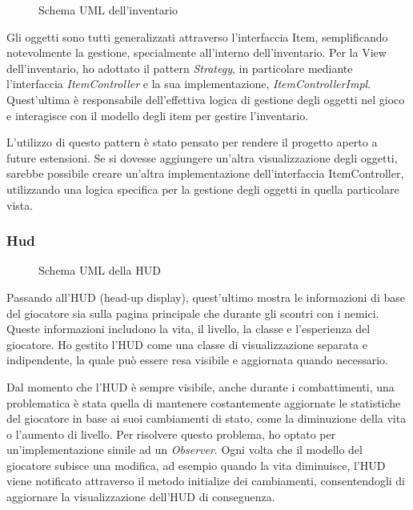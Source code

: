 \documentclass[a4paper,12pt]{report}
\begin{document}
\begin{figure}[H]
	\centering
	
	\caption{Schema UML dell'inventario}
	\label{fig:the-exiled-inventory-uml}
\end{figure}

Gli oggetti sono tutti generalizzati attraverso l'interfaccia Item, semplificando notevolmente la gestione, specialmente all'interno dell'inventario. Per la View dell'inventario, ho adottato il pattern \textit{Strategy}, in particolare mediante l'interfaccia \textit{ItemController} e la sua implementazione, \textit{ItemControllerImpl}. Quest'ultima è responsabile dell'effettiva logica di gestione degli oggetti nel gioco e interagisce con il modello degli item per gestire l'inventario.

L'utilizzo di questo pattern è stato pensato per rendere il progetto aperto a future estensioni. Se si dovesse aggiungere un'altra visualizzazione degli oggetti, sarebbe possibile creare un'altra implementazione dell'interfaccia ItemController, utilizzando una logica specifica per la gestione degli oggetti in quella particolare vista.
\subsubsection{Hud}
\begin{figure}[H]
	\centering
	
	\caption{Schema UML della HUD}
	\label{fig:the-exiled-hud-uml}
\end{figure}

Passando all'HUD (head-up display), quest'ultimo mostra le informazioni di base del giocatore sia sulla pagina principale che durante gli scontri con i nemici. Queste informazioni includono la vita, il livello, la classe e l'esperienza del giocatore. Ho gestito l'HUD come una classe di visualizzazione separata e indipendente, la quale può essere resa visibile e aggiornata quando necessario.

Dal momento che l'HUD è sempre visibile, anche durante i combattimenti, una problematica è stata quella di mantenere costantemente aggiornate le statistiche del giocatore in base ai suoi cambiamenti di stato, come la diminuzione della vita o l'aumento di livello. Per risolvere questo problema, ho optato per un'implementazione simile ad un \textit{Observer}. Ogni volta che il modello del giocatore subisce una modifica, ad esempio quando la vita diminuisce, l'HUD viene notificato attraverso il metodo initialize dei cambiamenti, consentendogli di aggiornare la visualizzazione dell'HUD di conseguenza.
\end{document}

